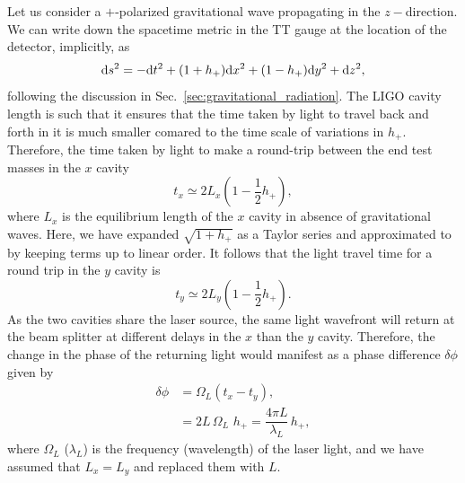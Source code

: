 Let us consider a $+$-polarized gravitational wave propagating in the 
$z-$direction. We can write down the spacetime metric in the TT gauge at the
location of the detector, implicitly, as
%
\begin{equation}
 \mathrm{d} s^2 = -\mathrm{d} t^2 + (1+h_+)\mathrm{d} x^2 + (1-h_+)\mathrm{d} y^2 + \mathrm{d} z^2,
\end{equation}
% 
following the discussion in Sec.~\ref{sec:gravitational_radiation}. The LIGO 
cavity length is such that it ensures that the time taken by light to travel 
back and forth in it is much smaller comared to the time scale of variations in
$h_+$. Therefore, the time taken by light to make a round-trip between the end
test masses in the $x$ cavity 
% 
\begin{equation}
 t_x \simeq 2L_x (1 - \frac{1}{2}h_+),
\end{equation}
% 
where $L_x$ is the equilibrium length of the $x$ cavity in absence of 
gravitational waves. Here, we have expanded $\sqrt{1+h_+}$ as a Taylor series
and approximated to by keeping terms up to linear order. 
It follows that the light travel time for a round trip in 
the $y$ cavity is
% 
\begin{equation}
 t_y \simeq 2L_y (1 - \frac{1}{2}h_+).
\end{equation}
% 
As the two cavities share the laser source, the same light wavefront will 
return at the beam splitter at different delays in the $x$ than the $y$ cavity. 
Therefore, the change in the phase of the returning light would manifest as a 
phase difference $\delta\phi$ given by
% 
\begin{align}
 \delta\phi &= \Omega_L (t_x - t_y), \\ \nonumber
 &= 2 L\, \Omega_L\,\, h_+ = \dfrac{4\pi L}{\lambda_L}\,h_+,
\end{align}
where $\Omega_L$ ($\lambda_L$) is the frequency (wavelength) of the laser 
light, and we have assumed that $L_x = L_y$ and replaced them with $L$. 

